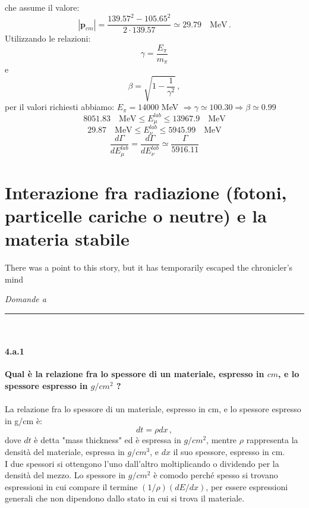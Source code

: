 \documentclass[twoside]{article}
\begin{document}
che assume il valore:
\begin{equation}
|\mathbf{p}_{cm}|=\frac{139.57^2-105.65^2}{2\cdot 139.57}\simeq 29.79 \quad \text{MeV} \, .
\end{equation}
Utilizzando le relazioni:
\begin{equation}
\gamma=\frac{E_\pi}{m_\pi}
\end{equation}
e
\begin{equation}
\beta=\sqrt{1-\frac{1}{\gamma^2}} \, ,
\end{equation}
per il valori richiesti abbiamo: $E_\pi=14000$ MeV $\Rightarrow \gamma\simeq 100.30 \Rightarrow \beta \simeq 0.99$
\begin{equation}
8051.83 \quad \text{MeV} \leq E_\mu^{lab} \leq 13967.9 \quad \text{MeV}
\end{equation}
\begin{equation}
29.87 \quad \text{MeV} \leq E_\nu^{lab} \leq 5945.99 \quad \text{MeV} 
\end{equation}
\begin{equation}
\frac{d\Gamma}{dE_\mu^{lab}}=\frac{d\Gamma}{dE_\nu^{lab}} \simeq \frac{\Gamma}{5916.11}
\end{equation}





\newpage
\section{Interazione fra radiazione (fotoni, particelle cariche o neutre) e la
materia stabile}

\epigraph{There was a point to this story, but it has temporarily escaped the chronicler's mind}{}
\textit{Domande a}\rule{13.7 cm}{0.4pt}
\\
\paragraph{4.a.1}\textbf{Qual è la relazione fra lo spessore di un materiale, espresso in $cm$, e lo spessore espresso in $g/cm^2$ ?}\\
\\
La relazione fra lo spessore di un materiale, espresso in cm, e lo spessore espresso in g/cm è:
\begin{equation}
dt=\rho dx \, ,
\end{equation}
dove $dt$ è detta "mass thickness" ed è espressa in $g/cm^{2}$, mentre $\rho$ rappresenta la densità del materiale, espressa in $g/cm^{3}$, e $dx$ il suo spessore, espresso in cm.\\
I due spessori si ottengono l’uno dall'altro moltiplicando o dividendo per la densità del mezzo. Lo spessore in $g/cm^2$ è comodo perché spesso si trovano espressioni in cui compare il termine $(1/\rho)(dE/dx)$, per essere espressioni generali che non dipendono dallo stato in cui si trova il materiale.
\end{document}
